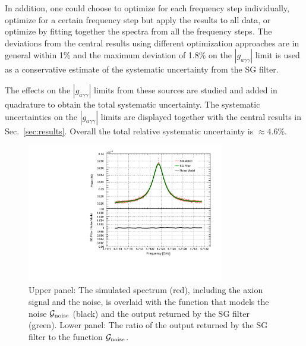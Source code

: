 \documentclass[%
reprint, %
superscriptaddress,
 amsmath,amssymb,
 aps
]{revtex4-2}
\begin{document}
\begin{itemize}
In addition, one could choose to optimize for each frequency step 
individually, optimize for a certain frequency step but apply the results to 
all data, or optimize by fitting together the spectra from all the frequency 
steps. 
The deviations from the central results using different optimization 
approaches are in general within 1\% and the 
maximum deviation of 1.8\% 
on the $\left|g_{a\gamma\gamma}\right|$ limit is used as a conservative estimate of the systematic 
uncertainty from the SG filter. 

\end{itemize}


The effects on the $\left|g_{a\gamma\gamma}\right|$ limits from these sources 
are studied and added in quadrature to obtain the total systematic uncertainty.
 The systematic uncertainties on the $\left|g_{a\gamma\gamma}\right|$ limits 
are displayed together with the central results in Sec.~\ref{sec:results}. 
Overall the total relative systematic uncertainty is $\approx 4.6\%$.

\begin{figure} [htbp]
  \centering
  \includegraphics[width=8.6cm]{Figure7.pdf}
  \caption{Upper panel: 
 The simulated spectrum (red), including the axion signal and the 
noise, is overlaid with the function that models the noise 
${\cal G}_\text{noise}$ (black) and the 
output returned by the SG filter (green). Lower panel: The ratio of the output 
returned by the SG filter to the function ${\cal G}_\text{noise}$.}
  \label{fig:sgcompare}
\end{figure}
\end{document}
